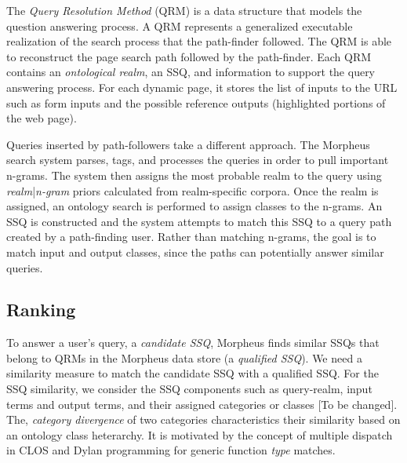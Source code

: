 The \emph{Query Resolution Method} (QRM) is a data structure that models the
question answering process. A QRM represents a generalized executable realization of the search process that the path-finder followed. The QRM is able to reconstruct the page search path followed by the path-finder. Each QRM contains an \emph{ontological realm}, an SSQ, and information to support the query answering process. For each dynamic page, it stores the list of inputs to the URL such as form inputs and the possible reference outputs (highlighted portions of the web page).



Queries inserted by path-followers take a different approach. The Morpheus search system parses, tags, and processes the queries in order to pull important n-grams. The system then assigns the most probable realm to the query using \textit{realm}|\textit{n-gram} priors calculated from realm-specific corpora. Once the realm is assigned, an ontology search is performed to assign classes to the n-grams. An SSQ is constructed and the system attempts to match this SSQ to a query path created by a path-finding user. Rather than matching n-grams, the goal is to match input and output classes, since the paths can potentially answer similar queries.


\subsection{Ranking} 
\label{sec:qrm_ranking}

To answer a user's query, a \textit{candidate
SSQ}, Morpheus finds similar SSQs that belong to QRMs in the Morpheus data store (a \textit{qualified SSQ}). We need a similarity measure to match the candidate SSQ
with a qualified SSQ. For the SSQ similarity, we
consider the SSQ components such as query-realm, input
terms and output terms, and their assigned categories or classes [To be changed]. The,
\textit{category divergence} of two categories characteristics their 
similarity based on an ontology class heterarchy. 
It is motivated by the concept of multiple
dispatch in CLOS and Dylan programming for generic function \emph{type} matches. 


